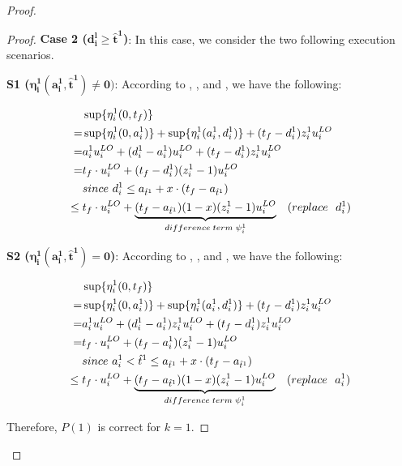 \documentclass[10pt,journal,compsoc]{IEEEtran}
\begin{document}
\begin{proof}
\begin{proof}
\textbf{Case 2 ($\mathbf{d_i^{l}\ge{}\hat{t}^{1}}$)}: In this case, we consider the two following execution scenarios.

\noindent\textbf{S1 ($\mathbf{\eta_i^1(a_i^{1},\hat{t}^{1})\neq{0}})$}:
According to ,  , and , we have the following:
\begin{small}
\begin{align*}
	&\sups{\eta_i^{1}(0,t_f)} \nonumber \\
=&\sups{\eta_i^{1}(0,a_i^{1})}+\sups{\eta_i^{1}(a_i^{1},d_i^{1})}+(t_f-d_i^{1}){z_i^{1}}{u_i^{LO}} \nonumber  \\
=&a_i^{1}{u_i^{LO}}+(d_i^{1}-a_i^{1}){u_i^{LO}}+(t_f-d_i^{1}){z_i^{1}}{u_i^{LO}}\nonumber \\
=&t_f\cdot{}u_i^{LO}+(t_f-d_i^{1})(z_i^1-1)u_i^{LO} \nonumber \\
&since\  d_i^{1}\le{a_{\hat{t}^1}+x\cdot{(t_f-a_{\hat{t}^1})}} \nonumber \\
\le{}& t_f\cdot{}u_i^{LO}+\underbrace{(t_f-a_{\hat{t}^1})(1-x)(z_i^1-1)u_i^{LO}}_{difference\;term\;\psi_i^{1}}  \ \ \  (replace\ \ d_i^{1}) 
\end{align*}
\end{small}

\noindent\textbf{S2 ($\mathbf{\eta_i^1(a_i^1,\hat{t}^{1})={0}}$)}: 
According to  ,  , and , we have the following:
\begingroup
\allowdisplaybreaks
\begin{small}
\begin{align*}
	&\sups{\eta_i^{1}(0,t_f)} \nonumber \\
=&\sups{\eta_i^{1}(0,a_i^{1})}+\sups{\eta_i^{1}(a_i^{1},d_i^{1})}+(t_f-d_i^{1}){z_i^{1}}{u_i^{LO}} \nonumber  \\
=&a_i^{1}{u_i^{LO}}+(d_i^{1}-a_i^{1})z_i^1{u_i^{LO}}+(t_f-d_i^{1}){z_i^{1}}{u_i^{LO}}\nonumber \\
=&t_f\cdot{}u_i^{LO}+(t_f-a_{i}^1)(z_i^1-1)u_i^{LO} \nonumber \\
&since\  a_{i}^1<\hat{t}^1\le{a_{\hat{t}^1}+x\cdot{(t_f-a_{\hat{t}^1})}} \nonumber \\
\le{}& t_f\cdot{}u_i^{LO}+\underbrace{(t_f-a_{\hat{t}^1})(1-x)(z_i^1-1)u_i^{LO}}_{difference\;term\;\psi_i^{1}}   \ \ \  (replace\ \ a_{i}^1) 
\end{align*}
\end{small}
\endgroup
Therefore, $P(1)$ is correct for $k=1$. 
\end{proof}


\end{proof}
\end{document}
